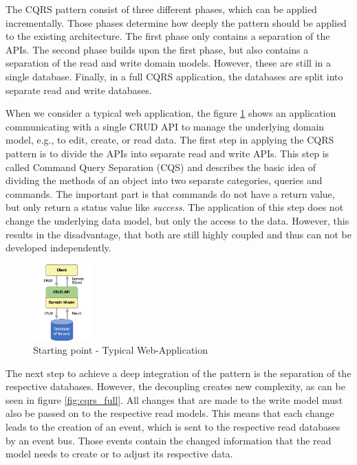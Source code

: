 \documentclass[conference]{IEEEtran}
\begin{document}
The CQRS pattern consist of three different phases, which can be applied incrementally. 
Those phases determine how deeply the pattern should be applied to the existing architecture.
The first phase only contains a separation of the APIs. The second phase builds upon the first phase, but also contains a separation of the read and write domain models. However, these are still in a single database. Finally, in a full CQRS application, the databases are split into separate read and write databases. \cite{IBM_cqrs_2021}

When we consider a typical web application, the figure \ref{fig:cqrs_start} shows an application communicating with a single CRUD API to manage the underlying domain model, e.g., to edit, create, or read data. The first step in applying the CQRS pattern is to divide the APIs into separate read and write APIs. \cite{IBM_cqrs_2021} This step is called Command Query Separation (CQS) and describes the basic idea of dividing the methods of an object into two separate categories, queries and commands. The important part is that commands do not have a return value, but only return a status value like \textit{success}. The application of this step does not change the underlying data model, but only the access to the data. \cite{fowler_cqs_2005} However, this results in the disadvantage, that both are still highly coupled and thus can not be developed independently. 

\begin{figure}[h]
    \centering
    \includegraphics[width=0.2\textwidth]{figures/cqrs_start}
    \caption{Starting point - Typical Web-Application \cite{IBM_cqrs_2021}} 
    \label{fig:cqrs_start}
\end{figure}

The next step to achieve a deep integration of the pattern is the separation of the respective databases. However, the decoupling creates new complexity, as can be seen in figure \ref{fig:cqrs_full}. All changes that are made to the write model must also be passed on to the respective read models. This means that each change leads to the creation of an event, which is sent to the respective read databases by an event bus. Those events contain the changed information that the read model needs to create or to adjust its respective data. 
\end{document}
